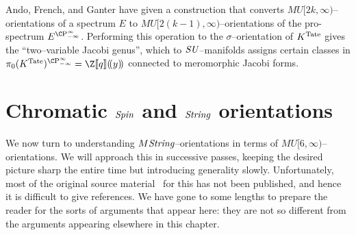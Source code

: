 \begin{remark}
Ando, French, and Ganter have given a construction that converts \(MU[2k, \infty)\)--orientations of a spectrum \(E\) to \(MU[2(k-1), \infty)\)--orientations of the pro-spectrum \(E^{\CP^\infty_{-\infty}}\).  Performing this operation to the \(\sigma\)--orientation of \(K^{\mathrm{Tate}}\) gives the ``two--variable Jacobi genus'', which to \(\mathit{SU}\)--manifolds assigns certain classes in \(\pi_0 (K^{\Tate})^{\CP^\infty_{-\infty}} = \Z\ps{q}(\!(y)\!)\) connected to meromorphic Jacobi forms.
\end{remark}













\section{Chromatic \texorpdfstring{\(\mathit{Spin}\)}{Spin} and \texorpdfstring{\(\mathit{String}\)}{String} orientations}

We now turn to understanding \(M\mathit{String}\)--orientations in terms of \(MU[6, \infty)\)--orientations.  We will approach this in successive passes, keeping the desired picture sharp the entire time but introducing generality slowly.  Unfortunately, most of the original source material~\cite{HAS,StricklandFSKS} for this has not been published, and hence it is difficult to give references.  We have gone to some lengths to prepare the reader for the sorts of arguments that appear here: they are not so different from the arguments appearing elsewhere in this chapter.


